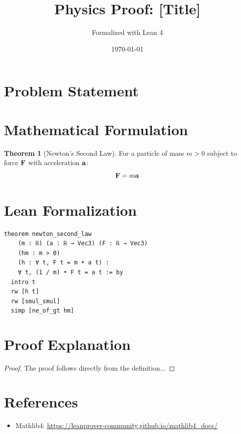 \documentclass[11pt,a4paper]{article}
\title{Physics Proof: [Title]}
\author{Formalized with Lean 4}
\date{\today}
\theoremstyle{definition}
\newtheorem{theorem}{Theorem}[section]
\begin{document}
\maketitle

\section{Problem Statement}


\section{Mathematical Formulation}

\begin{theorem}[Newton's Second Law]
For a particle of mass $m > 0$ subject to force $\vb{F}$ with acceleration $\vb{a}$:
\[
\vb{F} = m \vb{a}
\]
\end{theorem}

\section{Lean Formalization}

\begin{lstlisting}
theorem newton_second_law
    (m : ℝ) (a : ℝ → Vec3) (F : ℝ → Vec3)
    (hm : m > 0)
    (h : ∀ t, F t = m • a t) :
    ∀ t, (1 / m) • F t = a t := by
  intro t
  rw [h t]
  rw [smul_smul]
  simp [ne_of_gt hm]
\end{lstlisting}

\section{Proof Explanation}


\begin{proof}
The proof follows directly from the definition...
\end{proof}

\section{References}

\begin{itemize}
  \item Mathlib4: \url{https://leanprover-community.github.io/mathlib4_docs/}
\end{itemize}
\end{document}
